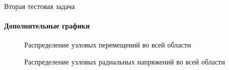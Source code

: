 \documentclass{beamer}
\begin{document}
\begin{frame}{Вторая тестовая задача}
\framesubtitle{Дополнительные графики}
\begin{multicols}{2}
\begin{figure}[h]
\caption{Распределение узловых перемещений во всей области}
\end{figure}
\columnbreak
\begin{figure}[h]
\caption{Распределение узловых радиальных напряжений во всей области}
\end{figure}
\end{multicols}
\end{frame}
\end{document}

